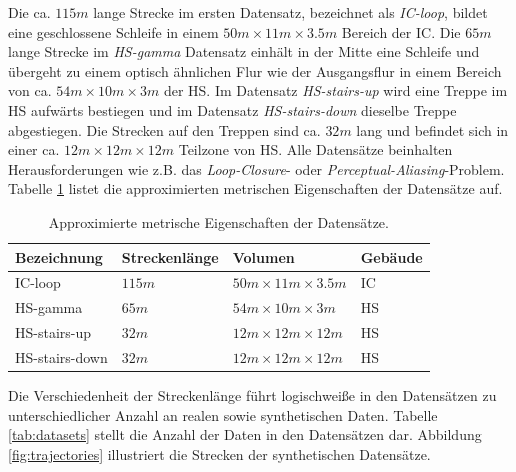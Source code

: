 Die ca. $115m$ lange Strecke im ersten Datensatz, bezeichnet als \textit{IC-loop}, bildet eine geschlossene Schleife in einem $50m \times 11m \times 3.5m$ Bereich der IC. Die $65m$ lange Strecke im \textit{HS-gamma} Datensatz einhält in der Mitte eine Schleife und übergeht zu einem optisch ähnlichen Flur wie der Ausgangsflur in einem Bereich von ca. $54m \times 10m \times 3m$ der HS. Im Datensatz \textit{HS-stairs-up} wird eine Treppe im HS aufwärts bestiegen und im Datensatz \textit{HS-stairs-down} dieselbe Treppe abgestiegen. Die Strecken auf den Treppen sind ca. $32m$ lang und befindet sich in einer ca. $12m \times 12m \times 12m$ Teilzone von HS.
Alle Datensätze beinhalten Herausforderungen wie z.B. das \textit{Loop-Closure}- oder \textit{Perceptual-Aliasing}-Problem.
Tabelle \ref{tab:dataset_metrics} listet die approximierten metrischen Eigenschaften der Datensätze auf. 

\begin{table}[H]
	\centering
	\caption{Approximierte metrische Eigenschaften der Datensätze.}
	\begin{tabularx}{1.0\textwidth}{X X X >{\centering\arraybackslash}p{1.7cm} }
		\textbf{Bezeichnung} & \textbf{Streckenlänge} & \textbf{Volumen} & \textbf{Gebäude}\\
		\hline
		IC-loop & $115m$ & $50m \times 11m \times 3.5m$ & IC \\
		\hline
		HS-gamma & $65m$ & $54m \times 10m \times 3m$ & HS\\
		\hline
		HS-stairs-up & $32m$ & $12m \times 12m \times 12m$ & HS\\
		\hline
		HS-stairs-down & $32m$ & $12m \times 12m \times 12m$ & HS\\
	\end{tabularx}
	\label{tab:dataset_metrics}
\end{table}




Die Verschiedenheit der Streckenlänge führt logischweiße in den Datensätzen zu unterschiedlicher Anzahl an realen sowie synthetischen Daten. Tabelle \ref{tab:datasets} stellt die Anzahl der Daten in den Datensätzen dar.
Abbildung \ref{fig:trajectories} illustriert die Strecken der synthetischen Datensätze. 


